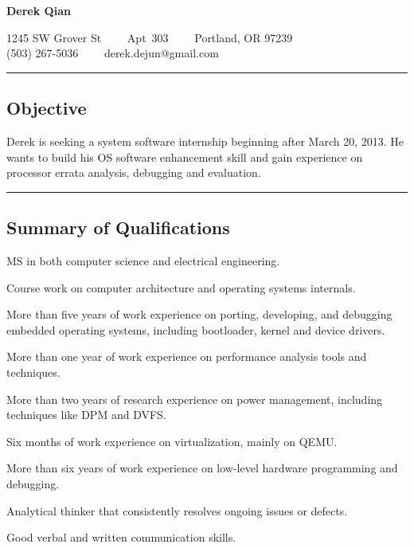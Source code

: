 \documentclass[10pt,letterpaper]{article}
\newenvironment{indentsection}[1]%
{\begin{list}{}%
	{\setlength{\leftmargin}{#1}}%
	\item[]%
}
{\end{list}}
\begin{document}
\begin{center}
{\LARGE \textbf{Derek Qian}}

1245 SW Grover St\ \ \textbullet
\ \ Apt\ 303\ \ \textbullet
\ \ Portland, OR 97239
\\
(503) 267-5036\ \ \textbullet
\ \ derek.dejun@gmail.com
\end{center}

\hrule
\vspace{-0.4em}
\subsection*{Objective}

\begin{indentsection}{\parindent}
Derek is seeking a system software internship beginning after March 20, 2013. He wants to build his OS software enhancement skill and gain experience on processor errata analysis, debugging and evaluation.
\end{indentsection}

\hrule
\vspace{-0.4em}
\subsection*{Summary of Qualifications}
\begin{itemize*}
	\item MS in both computer science and electrical engineering.
	\item Course work on computer architecture and operating systems internals.
	\item More than five years of work experience on porting, developing, and debugging embedded operating systems, including bootloader, kernel and device drivers.
	\item More than one year of work experience on performance analysis tools and techniques.
	\item More than two years of research experience on power management, including techniques like DPM and DVFS.
	\item Six months of work experience on virtualization, mainly on QEMU.
	\item More than six years of work experience on low-level hardware programming and debugging.
	\item Analytical thinker that consistently resolves ongoing issues or defects.
	\item Good verbal and written communication skills.
\end{itemize*}
\end{document}

